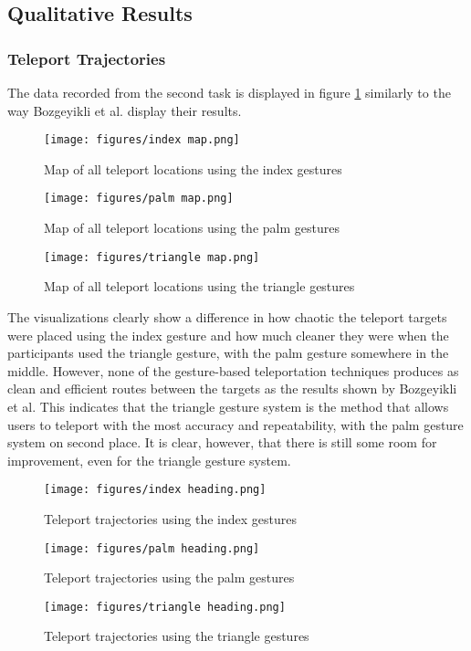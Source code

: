 \subsection{Qualitative Results}

\subsubsection{Teleport Trajectories}
The data recorded from the second task is displayed in figure \ref{fig:exp2maps} similarly to the way Bozgeyikli et al. \cite{bozgeyikli} display their results. 

\begin{figure}[!htb]
        \texttt{[image: figures/index map.png]}
        \caption{Map of all teleport locations using the index gestures}\label{fig:map_index}
    \endminipage\hfill
        \texttt{[image: figures/palm map.png]}
        \caption{Map of all teleport locations using the palm gestures}\label{fig:map_palm}
    \endminipage\hfill
        \texttt{[image: figures/triangle map.png]}
        \caption{Map of all teleport locations using the triangle gestures}\label{fig:map_triangle}
        \label{fig:exp2maps}
    \endminipage
\end{figure}
    
The visualizations clearly show a difference in how chaotic the teleport targets were placed using the index gesture and how much cleaner they were when the participants used the triangle gesture, with the palm gesture somewhere in the middle. However, none of the gesture-based teleportation techniques produces as clean and efficient routes between the targets as the results shown by Bozgeyikli et al. This indicates that the triangle gesture system is the method that allows users to teleport with the most accuracy and repeatability, with the palm gesture system on second place. It is clear, however, that there is still some room for improvement, even for the triangle gesture system. 

\begin{figure}[!htb]
        \texttt{[image: figures/index heading.png]}
        \caption{Teleport trajectories using the index gestures}\label{fig:map_index2}
    \endminipage\hfill
        \texttt{[image: figures/palm heading.png]}
        \caption{Teleport trajectories using the palm gestures}\label{fig:map_palm2}
    \endminipage\hfill
        \texttt{[image: figures/triangle heading.png]}
        \caption{Teleport trajectories using the triangle gestures}\label{fig:map_triangle2}
    \endminipage
\end{figure}

